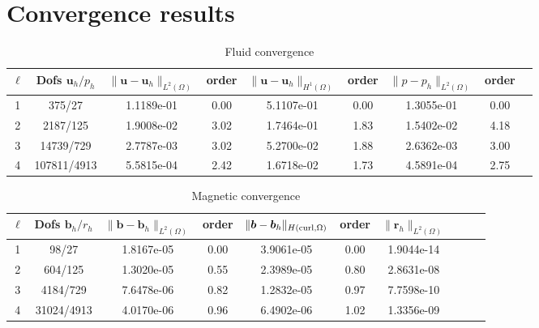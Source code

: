 \documentclass{article}
\newcommand{\uu}[1]{\boldsymbol #1}
\begin{document}
\section{Convergence results}

\begin{table}[h!]
\begin{center}
\begin{tabular}{ccccccccc}
\hline \hline
$\ell$ &    Dofs $\uu{u}_h/p_h$ & $\|\uu{u}-\uu{u}_h\|_{L^2(\Omega)}$ & order & $\|\uu{u}-\uu{u}_h\|_{H^1(\Omega)}$ & order & $\|{p}-{p}_h\|_{L^2(\Omega)}$ & order \\
\hline \hline
 1 &     375/27 &  1.1189e-01 &     0.00 &  5.1107e-01 &     0.00 &  1.3055e-01 &      0.00 \\
 2 &    2187/125 &  1.9008e-02 &     3.02 &  1.7464e-01 &     1.83 &  1.5402e-02 &      4.18 \\
 3 &   14739/729 &  2.7787e-03 &     3.02 &  5.2700e-02 &     1.88 &  2.6362e-03 &      3.00 \\
 4 &  107811/4913 &  5.5815e-04 &     2.42 &  1.6718e-02 &     1.73 &  4.5891e-04 &      2.75 \\
\hline \hline
\end{tabular}
\caption{Fluid convergence}
\label{tab:FluidConvergence}
\end{center}
\end{table}

\begin{table}[h!]
\begin{center}
\begin{tabular}{cccccccccc}
\hline \hline
$\ell$ &    Dofs $\uu{b}_h/r_h$ & $\|\uu{b}-\uu{b}_h\|_{L^2(\Omega)}$ & order & $\|\uu{b}-\uu{b}_h\|_{H({\rm curl},\Omega)}$ & order & $\|\uu{r}_h\|_{L^2(\Omega)}$ \\ \hline \hline
 1 &     98/27 &  1.8167e-05 &     0.00 &  3.9061e-05 &        0.00 & 1.9044e-14 \\
 2 &    604/125 &  1.3020e-05 &     0.55 &  2.3989e-05 &        0.80 & 2.8631e-08 \\
 3 &   4184/729 &  7.6478e-06 &     0.82 &  1.2832e-05 &        0.97 & 7.7598e-10 \\
 4 &  31024/4913 &  4.0170e-06 &     0.96 &  6.4902e-06 &        1.02 & 1.3356e-09 \\
\hline \hline
\end{tabular}
\caption{Magnetic convergence}
\label{tab:MagneticConvergence}
\end{center}
\end{table}
\end{document}
